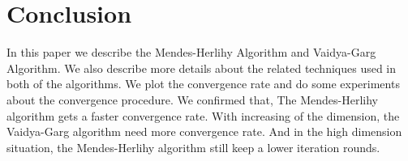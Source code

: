 \section{Conclusion}

In this paper we describe the Mendes-Herlihy Algorithm
and Vaidya-Garg Algorithm. We also describe more details
about the related techniques used in both of the algorithms.
We plot the convergence rate and do some experiments
about the convergence procedure. We confirmed that,
The Mendes-Herlihy algorithm gets a faster convergence rate.
With increasing of the dimension, the Vaidya-Garg algorithm
need more convergence rate. And in the high dimension situation,
the Mendes-Herlihy algorithm still keep a lower iteration
rounds.
